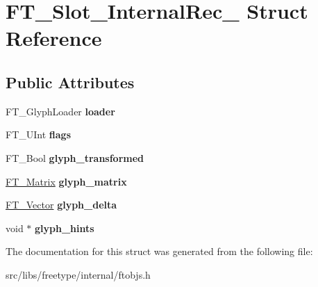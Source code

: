 \hypertarget{struct_f_t___slot___internal_rec__}{
\section{FT\_\-Slot\_\-InternalRec\_\- Struct Reference}
\label{struct_f_t___slot___internal_rec__}
}
\subsection*{Public Attributes}
\begin{DoxyCompactItemize}
\item 
\hypertarget{struct_f_t___slot___internal_rec___ac57f8c939f667938ab9f986088c15d8f}{
FT\_\-GlyphLoader {\bfseries loader}}
\label{struct_f_t___slot___internal_rec___ac57f8c939f667938ab9f986088c15d8f}

\item 
\hypertarget{struct_f_t___slot___internal_rec___a9a2a287ba2b363197b36fe24d2f48746}{
FT\_\-UInt {\bfseries flags}}
\label{struct_f_t___slot___internal_rec___a9a2a287ba2b363197b36fe24d2f48746}

\item 
\hypertarget{struct_f_t___slot___internal_rec___ac2bba891ac70016b74c085a05c1f182c}{
FT\_\-Bool {\bfseries glyph\_\-transformed}}
\label{struct_f_t___slot___internal_rec___ac2bba891ac70016b74c085a05c1f182c}

\item 
\hypertarget{struct_f_t___slot___internal_rec___a95af217daf1c2080692b5a69e345aa3b}{
\hyperlink{struct_f_t___matrix__}{FT\_\-Matrix} {\bfseries glyph\_\-matrix}}
\label{struct_f_t___slot___internal_rec___a95af217daf1c2080692b5a69e345aa3b}

\item 
\hypertarget{struct_f_t___slot___internal_rec___a2a94b955dd1e260aaf8699238d44769d}{
\hyperlink{struct_f_t___vector__}{FT\_\-Vector} {\bfseries glyph\_\-delta}}
\label{struct_f_t___slot___internal_rec___a2a94b955dd1e260aaf8699238d44769d}

\item 
\hypertarget{struct_f_t___slot___internal_rec___a16337853823cdccfb0c636673c4eb3ae}{
void $\ast$ {\bfseries glyph\_\-hints}}
\label{struct_f_t___slot___internal_rec___a16337853823cdccfb0c636673c4eb3ae}

\end{DoxyCompactItemize}


The documentation for this struct was generated from the following file:\begin{DoxyCompactItemize}
\item 
src/libs/freetype/internal/ftobjs.h\end{DoxyCompactItemize}
